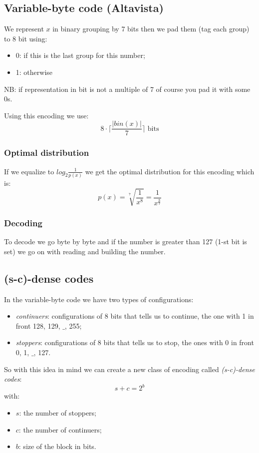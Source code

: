 \subsection{Variable-byte code (Altavista)}
We represent $x$ in binary grouping by 7 bits then we pad them (tag each group) to 8 bit using:
\begin{itemize}
    \item 0: if this is the last group for this number;
    \item 1: otherwise
\end{itemize}

NB: if representation in bit is not a multiple of 7 of course you pad it with some 0s.

Using this encoding we use:
$$
    8 \cdot \lceil \frac{|bin(x)|}{7} \rceil \text{ bits}
$$

\subsubsection{Optimal distribution}
If we equalize to $log_2 \frac{1}{p(x)}$ we get the optimal distribution for this encoding which is:
$$
    p(x) = \sqrt[7]{\frac{1}{x^8}} = \frac{1}{x^{\frac{8}{7}}}
$$

\subsubsection{Decoding}
To decode we go byte by byte and if the number is greater than 127 (1-st bit is set) we go on with reading and building the number.


\subsection{(s-c)-dense codes}
In the variable-byte code we have two types of configurations:
\begin{itemize}
    \item \emph{continuers}: configurations of 8 bits that tells us to continue, the one with 1 in front {128, 129, $\_$, 255};
    \item \emph{stoppers}: configurations of 8 bits that tells us to stop, the ones with 0 in front {0, 1, $\_$, 127}.
\end{itemize}
So with this idea in mind we can create a new class of encoding called \emph{(s-c)-dense codes}:
$$
    s + c = 2^b
$$
with:
\begin{itemize}
    \item $s$: the number of stoppers;
    \item $c$: the number of continuers;
    \item $b$: size of the block in bits.
\end{itemize}

